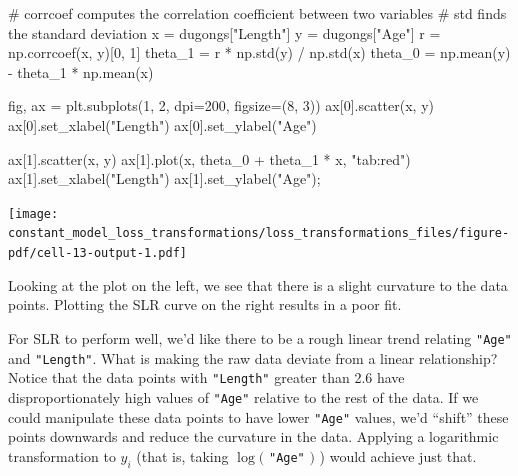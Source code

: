 \documentclass[
  letterpaper,
  DIV=11,
  numbers=noendperiod]{scrreprt}
\newenvironment{Shaded}{\begin{snugshade}}{\end{snugshade}}
\newcommand{\CommentTok}[1]{\textcolor[rgb]{0.37,0.37,0.37}{#1}}
\newcommand{\DecValTok}[1]{\textcolor[rgb]{0.68,0.00,0.00}{#1}}
\newcommand{\NormalTok}[1]{\textcolor[rgb]{0.00,0.23,0.31}{#1}}
\newcommand{\OperatorTok}[1]{\textcolor[rgb]{0.37,0.37,0.37}{#1}}
\newcommand{\StringTok}[1]{\textcolor[rgb]{0.13,0.47,0.30}{#1}}
\begin{document}
\begin{Shaded}
\begin{Highlighting}[]
\CommentTok{\# \textasciigrave{}corrcoef\textasciigrave{} computes the correlation coefficient between two variables}
\CommentTok{\# \textasciigrave{}std\textasciigrave{} finds the standard deviation}
\NormalTok{x }\OperatorTok{=}\NormalTok{ dugongs[}\StringTok{"Length"}\NormalTok{]}
\NormalTok{y }\OperatorTok{=}\NormalTok{ dugongs[}\StringTok{"Age"}\NormalTok{]}
\NormalTok{r }\OperatorTok{=}\NormalTok{ np.corrcoef(x, y)[}\DecValTok{0}\NormalTok{, }\DecValTok{1}\NormalTok{]}
\NormalTok{theta\_1 }\OperatorTok{=}\NormalTok{ r }\OperatorTok{*}\NormalTok{ np.std(y) }\OperatorTok{/}\NormalTok{ np.std(x)}
\NormalTok{theta\_0 }\OperatorTok{=}\NormalTok{ np.mean(y) }\OperatorTok{{-}}\NormalTok{ theta\_1 }\OperatorTok{*}\NormalTok{ np.mean(x)}

\NormalTok{fig, ax }\OperatorTok{=}\NormalTok{ plt.subplots(}\DecValTok{1}\NormalTok{, }\DecValTok{2}\NormalTok{, dpi}\OperatorTok{=}\DecValTok{200}\NormalTok{, figsize}\OperatorTok{=}\NormalTok{(}\DecValTok{8}\NormalTok{, }\DecValTok{3}\NormalTok{))}
\NormalTok{ax[}\DecValTok{0}\NormalTok{].scatter(x, y)}
\NormalTok{ax[}\DecValTok{0}\NormalTok{].set\_xlabel(}\StringTok{"Length"}\NormalTok{)}
\NormalTok{ax[}\DecValTok{0}\NormalTok{].set\_ylabel(}\StringTok{"Age"}\NormalTok{)}

\NormalTok{ax[}\DecValTok{1}\NormalTok{].scatter(x, y)}
\NormalTok{ax[}\DecValTok{1}\NormalTok{].plot(x, theta\_0 }\OperatorTok{+}\NormalTok{ theta\_1 }\OperatorTok{*}\NormalTok{ x, }\StringTok{"tab:red"}\NormalTok{)}
\NormalTok{ax[}\DecValTok{1}\NormalTok{].set\_xlabel(}\StringTok{"Length"}\NormalTok{)}
\NormalTok{ax[}\DecValTok{1}\NormalTok{].set\_ylabel(}\StringTok{"Age"}\NormalTok{)}\OperatorTok{;}
\end{Highlighting}
\end{Shaded}

\texttt{[image: constant\_model\_loss\_transformations/loss\_transformations\_files/figure-pdf/cell-13-output-1.pdf]}

Looking at the plot on the left, we see that there is a slight curvature
to the data points. Plotting the SLR curve on the right results in a
poor fit.

For SLR to perform well, we'd like there to be a rough linear trend
relating \texttt{"Age"} and \texttt{"Length"}. What is making the raw
data deviate from a linear relationship? Notice that the data points
with \texttt{"Length"} greater than 2.6 have disproportionately high
values of \texttt{"Age"} relative to the rest of the data. If we could
manipulate these data points to have lower \texttt{"Age"} values, we'd
``shift'' these points downwards and reduce the curvature in the data.
Applying a logarithmic transformation to \(y_i\) (that is, taking
\(\log(\) \texttt{"Age"} \()\) ) would achieve just that.
\end{document}
